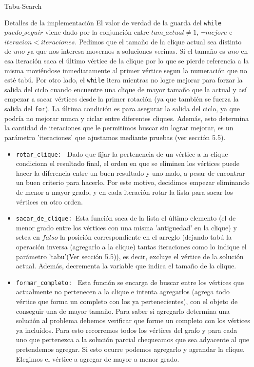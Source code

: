 \begin{section}{Tabu-Search}
\begin{subsection}{Detalles de la implementación}
		El valor de verdad de la guarda del \texttt{while} $puedo\_seguir$ viene dado por la conjunción entre $tam\_actual \neq 1$, $\neg mejore$ e $iteracion<iteraciones$.
		Pedimos que el tamaño de la clique actual sea distinto de $uno$ ya que nos interesa movernos a soluciones vecinas. Si el tamaño es $uno$ en esa iteración saca el último vértice de la clique por lo que se pierde referencia a la misma moviéndose inmediatamente al primer vértice segun la numeración que no esté tabú.
		Por otro lado, el \texttt{while} itera mientras no logre mejorar para forzar la salida del ciclo cuando encuentre una clique de mayor tamaño que la actual y así empezar a sacar vértices desde la primer rotación (ya que también se fuerza la salida del \texttt{for}).
		La última condición es para asegurar la salida del ciclo, ya que podría no mejorar nunca y ciclar entre diferentes cliques. Además, esto determina la cantidad de iteraciones que le permitimos buscar sin lograr mejorar, es un parámetro 'iteraciones' que ajustamos mediante pruebas (ver sección 5.5).
		\begin{itemize}			
			\item \texttt{rotar\_clique: } Dado que fijar la pertenencia de un vértice a la clique condiciona el resultado final, el orden en que se eliminen los vértices puede hacer la diferencia entre un buen resultado y uno malo, a pesar de encontrar un buen criterio para hacerlo. Por este motivo, decidimos empezar eliminando de menor a mayor grado, y en cada iteración rotar la lista para sacar los vértices en otro orden.
			
			\item \texttt{sacar\_de\_clique: }Esta función saca de la lista el último elemento (el de menor grado entre los vértices con una misma 'antiguedad' en la clique) y setea en $falso$ la posición correspondiente en el arreglo (dejando tabú la operación inversa (agregarlo a la clique) tantas iteraciones como lo indique el parámetro 'tabu'(Ver sección 5.5)), es decir, excluye el vértice de la solución actual. Además, decrementa la variable que indica el tamaño de la clique.
			
			\item \texttt{formar\_completo: } Esta función se encarga de buscar entre los vértices que actualmente no pertenecen a la clique e intenta agregarlos (agrega todo vértice que forma un completo con los ya pertenecientes), con el objeto de conseguir una de mayor tamaño. Para saber si agregarlo determina una solución al problema debemos verificar que forme un completo con los vértices ya incluídos. Para esto recorremos todos los vértices del grafo y para cada uno que pertenezca a la solución parcial chequeamos que sea adyacente al que pretendemos agregar. Si esto ocurre podemos agregarlo y agrandar la clique. Elegimos el vértice a agregar de mayor a menor grado.
			

\end{itemize}
\end{subsection}
\end{section}
